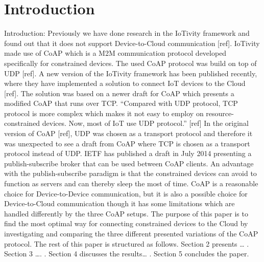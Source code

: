 \section{Introduction}
Introduction: Previously we have done research in the IoTivity framework and found out that it does not support Device-to-Cloud communication [ref]. IoTivity made use of CoAP which is a M2M communication protocol developed specifically for constrained devices. The used CoAP protocol was build on top of UDP [ref]. A new version of the IoTivity framework has been published recently, where they have implemented a solution to connect IoT devices to the Cloud [ref]. The solution was based on a newer draft for CoAP which presents a modified CoAP that runs over TCP. “Compared with UDP protocol, TCP protocol is more complex which makes it not easy to employ on resource-constrained devices. Now, most of IoT use UDP protocol.” [ref] In the original version of CoAP [ref], UDP was chosen as a transport protocol and therefore it was unexpected to see a draft from CoAP where TCP is chosen as a transport protocol instead of UDP. IETF has published a draft in July 2014 presenting a publish-subscribe broker that can be used between CoAP clients. An advantage with the publish-subscribe paradigm is that the constrained devices can avoid to function as servers and can thereby sleep the most of time. CoAP is a reasonable choice for Device-to-Device communication, but it is also a possible choice for Device-to-Cloud communication though it has some limitations which are handled differently by the three CoAP setups. The purpose of this paper is to find the most optimal way for connecting constrained devices to the Cloud by investigating and comparing the three different presented variations of the CoAP protocol. The rest of this paper is structured as follows. Section 2 presents … . Section 3 …. . Section 4 discusses the results… . Section 5 concludes the paper.